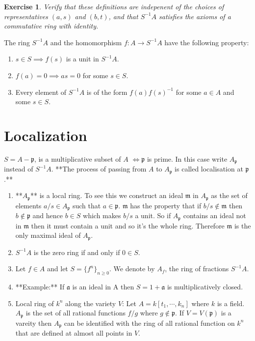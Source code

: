 \documentclass[]{report}
\newtheorem{exercise}[theorem]{Exercise}
\begin{document}
\begin{exercise}
    Verify that these definitions are indepenent of the choices of representatives $(a,s)$ and $(b,t)$, and that $S^{-1}A$ satisfies the axioms of a commutative ring with identity.
\end{exercise}

The ring $S^{-1}A$ and the homomorphism $f:A\rightarrow S^{-1}A$ have the following property:
\begin{enumerate}
    \item $s\in S \implies f(s)$ is a unit in $S^{-1}A$. 
    \item $f(a) = 0 \implies as = 0$ for some $s\in S$. 
    \item Every element of $S^{-1}A$ is of the form $f(a)f(s)^{-1}$ for some $a\in A$ and some $s\in S$. 
\end{enumerate}

\section{Localization}

$S = A - \mathfrak{p}$, is a multiplicative subset of $A$ $\Leftrightarrow \mathfrak{p}$ is prime. In this case write $A_\mathfrak{p}$ instead of $S^{-1}A$. **The process of passing from $A$ to $A_\mathfrak{p}$ is called localisation at $\mathfrak{p}$.**

\begin{enumerate}
    \item **$A_\mathfrak{p}$** is a local ring. To see this we construct an ideal $\mathfrak{m}$ in $A_\mathfrak{p}$ as the set of elements $a/s \in A_\mathfrak{p}$ such that $a\in \mathfrak{p}$. $\mathfrak{m}$ has the property that if $b/s\not \in \mathfrak{m}$ then $b\not \in \mathfrak{p}$ and hence $b\in S$ which makes $b/s$ a unit. So if $A_\mathfrak{p}$ contains an ideal not in $\mathfrak{m}$ then it must contain a unit and so it's the whole ring. Therefore $\mathfrak{m}$ is the only maximal ideal of $A_\mathfrak{p}$. 
    \item $S^{-1}A$ is the zero ring if and only if $0\in S$. 
    \item Let $f\in A$ and let $S = \{f^n\}_{n\geq 0}$. We denote by $A_f$, the ring of fractions $S^{-1}A$.
    \item **Example:** If $\mathfrak{a}$ is an ideal in A then $S = 1+\mathfrak{a}$ is multiplicatively closed. 
    \item Local ring of $k^n$ along the variety $V$: Let $A = k[t_1,\cdots,k_n]$ where $k$ is a field. $A_\mathfrak{p}$ is the set of all rational functions $f/g$ where $g\not \in \mathfrak{p}$. If $V = V(\mathfrak{p})$ is a vareity then $A_\mathfrak{p}$ can be identified with the ring of all rational function on $k^n$ that are defined at almost all points in $V$. 
\end{enumerate}
\end{document}

